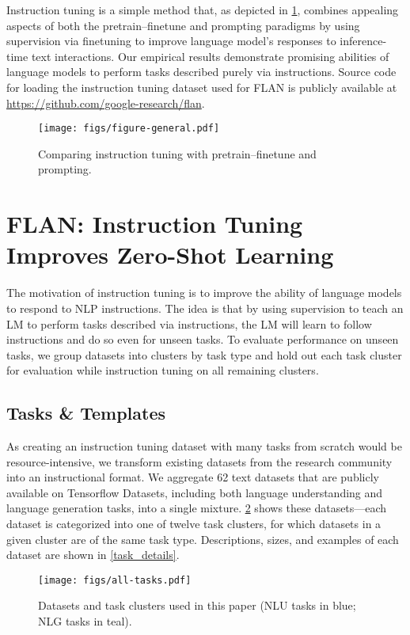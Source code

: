\documentclass{article} \usepackage{iclr2022_conference,times}
\newcommand{\flan}{FLAN}
\begin{document}
Instruction tuning is a simple method that, as depicted in \cref{fig:flan-paradigm}, combines appealing aspects of both the pretrain--finetune and prompting paradigms by using supervision via finetuning to improve language model's responses to inference-time text interactions.
Our empirical results demonstrate promising abilities of language models to perform tasks described purely via instructions.
Source code for loading the instruction tuning dataset used for \flan{} is publicly available at \url{https://github.com/google-research/flan}.

\begin{figure}[h]
    \centering
    \texttt{[image: figs/figure-general.pdf]}
    \vspace{-1mm}
    \caption{Comparing instruction tuning with pretrain--finetune and prompting.}
    \label{fig:flan-paradigm}
\end{figure}



\section{\flan: Instruction Tuning Improves Zero-Shot Learning}
The motivation of instruction tuning is to improve the ability of language models to respond to NLP instructions.
The idea is that by using supervision to teach an LM to perform tasks described via instructions, the LM will learn to follow instructions and do so even for unseen tasks. 
To evaluate performance on unseen tasks, we group datasets into clusters by task type and hold out each task cluster for evaluation while instruction tuning on all remaining clusters.

\subsection{Tasks \& Templates}\label{subsec:tasks_and_templates}
As creating an instruction tuning dataset with many tasks from scratch would be resource-intensive, we transform existing datasets from the research community into an instructional format. 
We aggregate 62 text datasets that are publicly available on Tensorflow Datasets, including both language understanding and language generation tasks, into a single mixture.
\cref{fig:flan-clusters} shows these datasets---each dataset is categorized into one of twelve task clusters, for which datasets in a given cluster are of the same task type. 
Descriptions, sizes, and examples of each dataset are shown in \cref{task_details}.
\vspace{-1mm}
\begin{figure}[h]
    \centering
    \texttt{[image: figs/all-tasks.pdf]}
    \vspace{-7mm}
    \caption{Datasets and task clusters used in this paper (NLU tasks in blue; NLG tasks in teal).}
    \vspace{-2mm}
    \label{fig:flan-clusters}
\end{figure}
\end{document}
